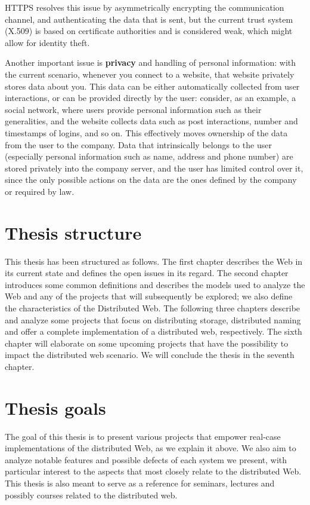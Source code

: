 \documentclass[mscthesis]{usiinfthesis}
\begin{document}
HTTPS resolves this issue by asymmetrically encrypting the communication channel, and authenticating the data that is sent, but the current trust system (X.509) is based on certificate authorities and is considered weak, which might allow for identity theft. %

Another important issue is \textbf{privacy} and handling of personal information: with the current scenario, whenever you connect to a website, that website privately stores data about you.
This data can be either automatically collected from user interactions, or can be provided directly by the user: consider, as an example, a social network, where users provide personal information such as their generalities, and the website collects data such as post interactions, number and timestamps of logins, and so on.
This effectively moves ownership of the data from the user to the company. Data that intrinsically belongs to the user (especially personal information such as name, address and phone number) are stored privately into the company server, and the user has limited control over it, since the only possible actions on the data are the ones defined by the company or required by law.

\section{Thesis structure}
This thesis has been structured as follows. The first chapter describes the Web in its current state and defines the open issues in its regard. The second chapter introduces some common definitions and describes the models used to analyze the Web and any of the projects that will subsequently be explored; we also define the characteristics of the Distributed Web. The following three chapters describe and analyze some projects that focus on distributing storage, distributed naming and offer a complete implementation of a distributed web, respectively. The sixth chapter will elaborate on some upcoming projects that have the possibility to impact the distributed web scenario. We will conclude the thesis in the seventh chapter.

\section{Thesis goals}
The goal of this thesis is to present various projects that empower real-case implementations of the distributed Web, as we explain it above. We also aim to analyze notable features and possible defects of each system we present, with particular interest to the aspects that most closely relate to the distributed Web. This thesis is also meant to serve as a reference for seminars, lectures and possibly courses related to the distributed web. %
\end{document}
